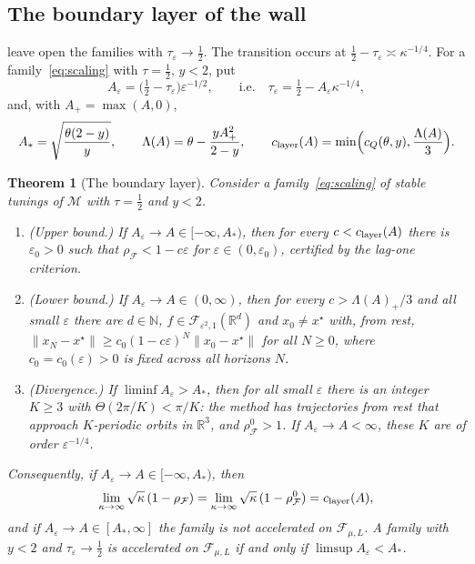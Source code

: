 \documentclass[11pt]{article}
\newtheorem{theorem}{Theorem}[section]
\theoremstyle{definition}
\theoremstyle{remark}
\newcommand{\R}{\mathbb R}
\newcommand{\N}{\mathbb N}
\newcommand{\cF}{\mathcal F}
\newcommand{\cM}{\mathcal M}
\newcommand{\norm}[1]{\lVert #1\rVert}
\newcommand{\rhoF}{\rho_{\cF}}
\newcommand{\rhoz}{\rho_{\cF}^{0}}
\newcommand{\cQ}{c_{Q}}
\begin{document}
\subsection{The boundary layer of the wall}
\label{sec:layer}

 leave open the families with \(\tau_\varepsilon\to\frac12\).  The
transition occurs at \(\frac12-\tau_\varepsilon\asymp\kappa^{-1/4}\).  For a
family~\eqref{eq:scaling} with \(\tau=\frac12\), \(y<2\), put
\[
A_\varepsilon=\bigl(\tfrac12-\tau_\varepsilon\bigr)\varepsilon^{-1/2},\qquad\text{i.e.}\quad
\tau_\varepsilon=\tfrac12-A_\varepsilon\kappa^{-1/4},
\]
and, with \(A_+=\max(A,0)\),
\begin{equation}\label{eq:layer}
A_*=\sqrt{\frac{\theta(2-y)}{y}},\qquad
\Lambda(A)=\theta-\frac{yA_+^2}{2-y},\qquad
\clayer(A)=\min\Bigl(\cQ(\theta,y),\frac{\Lambda(A)}3\Bigr).
\end{equation}

\begin{theorem}[The boundary layer]\label{thm:layer}
Consider a family~\eqref{eq:scaling} of stable tunings of \(\cM\) with
\(\tau=\frac12\) and \(y<2\).
\begin{enumerate}[label=\textup{(\alph*)}]
\item \textup{(Upper bound.)}  If \(A_\varepsilon\to A\in[-\infty,A_*)\), then for every
\(c<c_{\rm layer}(A)\) there is \(\varepsilon_0>0\) such that \(\rhoF<1-c\varepsilon\) for
\(\varepsilon\in(0,\varepsilon_0)\), certified by the lag-one criterion.
\item \textup{(Lower bound.)}  If \(A_\varepsilon\to A\in(0,\infty)\), then for every
\(c>\Lambda(A)_+/3\) and all small \(\varepsilon\) there are \(d\in\N\),
\(f\in\cF_{\varepsilon^2,1}(\R^d)\) and \(x_0\ne x^\star\) with, from rest,
\(\norm{x_N-x^\star}\ge c_0(1-c\varepsilon)^N\norm{x_0-x^\star}\) for all \(N\ge0\),
where \(c_0=c_0(\varepsilon)>0\) is fixed across all horizons \(N\).
\item \textup{(Divergence.)}  If \(\liminf A_\varepsilon>A_*\), then for all small
\(\varepsilon\) there is an integer \(K\ge3\) with \(\Theta(2\pi/K)<\pi/K\): the method has
trajectories from rest that approach \(K\)-periodic orbits in \(\R^3\), and
\(\rhoz>1\).  If \(A_\varepsilon\to A<\infty\), these \(K\) are of order \(\varepsilon^{-1/4}\).
\end{enumerate}
Consequently, if \(A_\varepsilon\to A\in[-\infty,A_*)\), then
\[
\lim_{\kappa\to\infty}\sqrt\kappa\,(1-\rhoF)=\lim_{\kappa\to\infty}\sqrt\kappa\,(1-\rhoz)=\clayer(A),
\]
and if \(A_\varepsilon\to A\in[A_*,\infty]\) the family is not accelerated on \(\cF_{\mu,L}\).  A family with
\(y<2\) and \(\tau_\varepsilon\to\frac12\) is accelerated on \(\cF_{\mu,L}\) if and only if
\(\limsup A_\varepsilon<A_*\).
\end{theorem}
\end{document}
